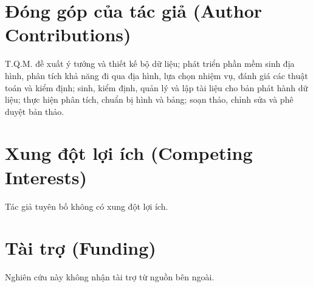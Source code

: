 \documentclass[11pt]{article}
\begin{document}
\section*{Đóng góp của tác giả (Author Contributions)}

T.Q.M. đề xuất ý tưởng và thiết kế bộ dữ liệu; phát triển phần mềm sinh địa
hình, phân tích khả năng đi qua địa hình, lựa chọn nhiệm vụ, đánh giá các thuật toán
và kiểm định; sinh, kiểm định, quản lý và lập tài liệu cho bản phát hành dữ liệu;
thực hiện phân tích, chuẩn bị hình và bảng; soạn thảo, chỉnh sửa và phê duyệt
bản thảo.

\section*{Xung đột lợi ích (Competing Interests)}

Tác giả tuyên bố không có xung đột lợi ích.

\section*{Tài trợ (Funding)}

Nghiên cứu này không nhận tài trợ từ nguồn bên ngoài.
\end{document}
